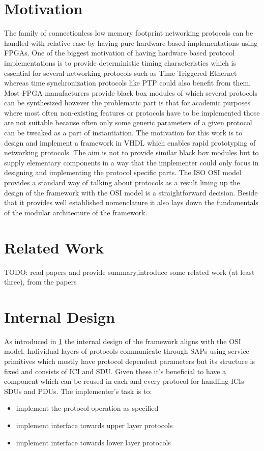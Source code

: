 \documentclass[conference]{IEEEtran}
\begin{document}

\section{Motivation}\label{sec:Motivation}

The family of connectionless low memory footprint networking protocols can be handled with relative ease by having pure hardware based implementations using FPGAs. One of the biggest motivation of having hardware based protocol implementations is to provide deterministic timing characteristics which is essential for several networking protocols such as Time Triggered Ethernet~\cite{SAE_AS6802} whereas time synchronization protocols like PTP could also benefit from them. Most FPGA manufacturers provide black box modules of which several protocols can be synthesized however the problematic part is that for academic purposes where most often non-existing features or protocols have to be implemented those are not suitable because often only some generic parameters of a given protocol can be tweaked as a part of instantiation. The motivation for this work is to design and implement a framework in VHDL which enables rapid prototyping of networking protocols. The aim is not to provide similar black box modules but to supply elementary components in a way that the implementer could only focus in designing and implementing the protocol specific parts. The ISO OSI model provides a standard way of talking about protocols as a result lining up the design of the framework with the OSI model is a straightforward decision. Beside that it provides well established nomenclature it also lays down the fundamentals of the modular architecture of the framework.

\section{Related Work}\label{sec:RelatedWork}

TODO: read papers and provide summary,introduce some related work (at least three), from the papers 

\section{Internal Design}\label{sec:Internal Design}

As introduced in \ref{sec:Motivation} the internal design of the framework aligns with the OSI model. Individual layers of protocols communicate through SAPs using service primitives which mostly have protocol dependent parameters but its structure is fixed and consists of ICI and SDU. Given these it's beneficial to have a component which can be reused in each and every protocol for handling ICIs SDUs and PDUs. The implementer's task is to:
\begin{itemize}
\renewcommand \labelitemi{--}
\item implement the protocol operation as specified
\item implement interface towards upper layer protocols
\item implement interface towards lower layer protocols
\end{itemize}
\end{document}
